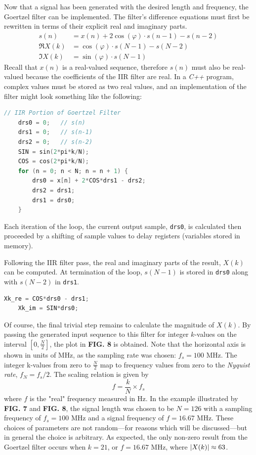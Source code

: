 \documentclass[reprint,amsmath,amssymb]{revtex4-2}
\begin{document}
Now that a signal has been generated with the desired length and frequency, the Goertzel filter can be implemented. The filter's difference equations must first be rewritten in terms of their explicit real and imaginary parts.
\begin{align}
    s(n) & = x(n) + 2\cos(\varphi)\cdot s(n-1) - s(n-2) \nonumber \\
    \Re{X(k)} & = \cos(\varphi)\cdot s(N-1) - s(N-2) \nonumber \\ 
    \Im{X(k)} & = \sin(\varphi)\cdot s(N-1)
\end{align}
Recall that $x(n)$ is a real-valued sequence, therefore $s(n)$ must also be real-valued because the coefficients of the IIR filter are real. In a \textit{C++} program, complex values must be stored as two real values, and an implementation of the filter might look something like the following:

\begin{lstlisting}[language=C++]
    // IIR Portion of Goertzel Filter
    drs0 = 0;   // s(n)
    drs1 = 0;   // s(n-1)
    drs2 = 0;   // s(n-2)
    SIN = sin(2*pi*k/N);
    COS = cos(2*pi*k/N);
    for (n = 0; n < N; n = n + 1) {
        drs0 = x[n] + 2*COS*drs1 - drs2;
        drs2 = drs1;
        drs1 = drs0;
    }
\end{lstlisting}

Each iteration of the loop, the current output sample, \verb+drs0+, is calculated then proceeded by a shifting of sample values to delay registers (variables stored in memory).

Following the IIR filter pass, the real and imaginary parts of the result, $X(k)$ can be computed. At termination of the loop, $s(N-1)$ is stored in \verb+drs0+ along with $s(N-2)$ in \verb+drs1+.
\begin{lstlisting}[language=C++]
    Xk_re = COS*drs0 - drs1;
    Xk_im = SIN*drs0;
\end{lstlisting}

Of course, the final trivial step remains to calculate the magnitude of $X(k)$. By passing the generated input sequence to this filter for integer $k$-values on the interval $[0, \frac{N}{2}]$, the plot in \textbf{FIG. 8} is obtained. Note that the horizontal axis is shown in units of MHz, as the sampling rate was chosen: $f_s = 100$ MHz. The integer k-values from zero to $\frac{N}{2}$ map to frequency values from zero to the \textit{Nyquist rate}, $f_{N} = f_s/2$. The scaling relation is given by
\begin{equation}
    f = \frac{k}{N} \times f_s
\end{equation}
where $f$ is the "real" frequency measured in Hz. In the example illustrated by \textbf{FIG. 7} and \textbf{FIG. 8}, the signal length was chosen to be $N = 126$ with a sampling frequency of $f_s = 100$ MHz and a signal frequency of $f = 16.67$ MHz. These choices of parameters are not random---for reasons which will be discussed---but in general the choice is arbitrary. As expected, the only non-zero result from the Goertzel filter occurs when $k = 21$, or $f = 16.67$ MHz, where $\abs{X(k)} \approx 63$.
\end{document}
